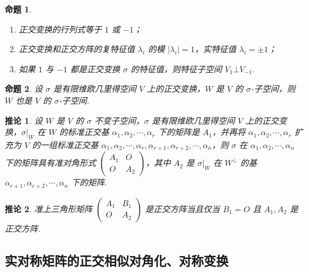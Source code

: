 \documentclass[zihao=-4,UTF8,linespread=1.8,nothm]{aytony_base}
\newtheorem{proposition}{\indent 命题}[subsection]
\newtheorem*{corollary}{\indent 推论}
\begin{document}
\begin{proposition}
    \begin{enumerate}[nosep]
        \item 正交变换的行列式等于 $1$ 或 $-1$；
        \item 正交变换和正交方阵的复特征值 $\lambda_i$ 的模 $|\lambda_i| = 1$，实特征值 $\lambda_i = \pm 1$；
        \item 如果 $1$ 与 $-1$ 都是正交变换 $\sigma$ 的特征值，则特征子空间 $V_1 \bot V_{-1}$.
    \end{enumerate}
\end{proposition}

\begin{proposition}
    设 $\sigma$ 是有限维欧几里得空间 $V$ 上的正交变换，$W$ 是 $V$ 的 $\sigma$-子空间，则 $W$ 也是
    $V$ 的 $\sigma$-子空间.
\end{proposition}

\begin{corollary}
    设 $W$ 是 $V$ 的 $\sigma$ 不变子空间，$\sigma$ 是有限维欧几里得空间 $V$ 上的正交变换，$\sigma |_W$ 在 $W$ 的标准正交基 ${\alpha}_1, {\alpha}_2, \cdots, {\alpha}_{r}$ 下的矩阵是 $A_1$，并再将 ${\alpha}_1, {\alpha}_2, \cdots, {\alpha}_{r}$ 扩充为 $V$ 的一组标准正交基 ${\alpha}_1, {\alpha}_2, \cdots, {\alpha}_{r}, {\alpha}_{r+1}, {\alpha}_{r+2}, \cdots, {\alpha}_{n}$，则 $\sigma$ 在 ${\alpha}_1, {\alpha}_2, \cdots, {\alpha}_{n}$ 下的矩阵具有准对角形式 $\left(
        \begin{matrix}
                A_1 & O   \\
                O   & A_2
            \end{matrix}
        \right)$，其中 $A_2$ 是 $\sigma | _W$ 在 $W ^{\bot}$ 的基 ${\alpha}_{r+1}, {\alpha}_{r+2}, \cdots, {\alpha}_{n}$ 下的矩阵.
\end{corollary}

\begin{corollary}
    准上三角形矩阵 $\left(
        \begin{matrix}
            A_1 & B_1 \\
            O   & A_2
        \end{matrix}
        \right)$ 是正交方阵当且仅当 $B_1 = O$ 且 $A_1, A_2$ 是正交方阵.
\end{corollary}

\subsection{实对称矩阵的正交相似对角化、对称变换}
\end{document}
